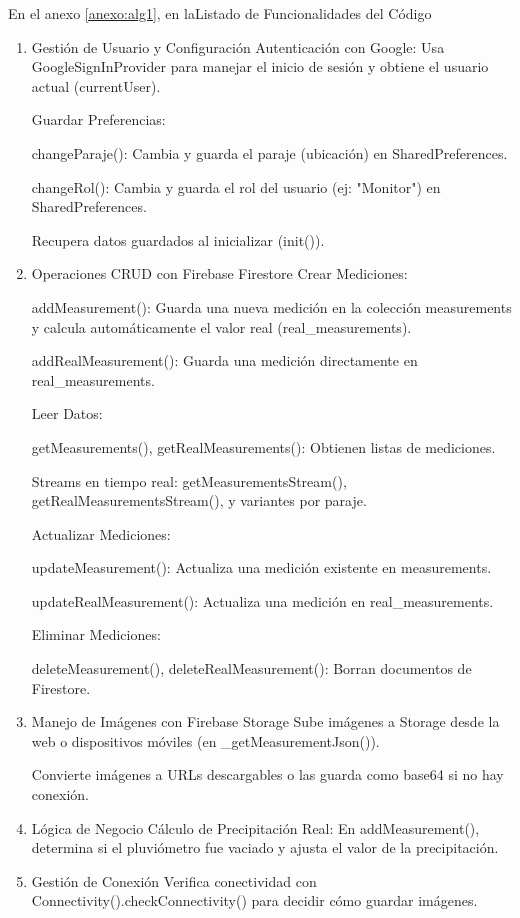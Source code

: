 En el anexo \ref{anexo:alg1}, en laListado de Funcionalidades del Código
\begin{enumerate}
    \item Gestión de Usuario y Configuración
    Autenticación con Google: Usa GoogleSignInProvider para manejar el inicio de sesión y obtiene el usuario actual (currentUser).
    
    Guardar Preferencias:
    
    changeParaje(): Cambia y guarda el paraje (ubicación) en SharedPreferences.
    
    changeRol(): Cambia y guarda el rol del usuario (ej: "Monitor") en SharedPreferences.
    
    Recupera datos guardados al inicializar (init()).
    
    \item Operaciones CRUD con Firebase Firestore
    Crear Mediciones:
    
    addMeasurement(): Guarda una nueva medición en la colección measurements y calcula automáticamente el valor real (real\_measurements).
    
    addRealMeasurement(): Guarda una medición directamente en real\_measurements.
    
    Leer Datos:
    
    getMeasurements(), getRealMeasurements(): Obtienen listas de mediciones.
    
    Streams en tiempo real: getMeasurementsStream(), getRealMeasurementsStream(), y variantes por paraje.
    
    Actualizar Mediciones:
    
    updateMeasurement(): Actualiza una medición existente en measurements.
    
    updateRealMeasurement(): Actualiza una medición en real\_measurements.
    
    Eliminar Mediciones:
    
    deleteMeasurement(), deleteRealMeasurement(): Borran documentos de Firestore.
    
    \item Manejo de Imágenes con Firebase Storage
    Sube imágenes a Storage desde la web o dispositivos móviles (en \_getMeasurementJson()).
    
    Convierte imágenes a URLs descargables o las guarda como base64 si no hay conexión.
    
    \item Lógica de Negocio
    Cálculo de Precipitación Real: En addMeasurement(), determina si el pluviómetro fue vaciado y ajusta el valor de la precipitación.
    
    \item Gestión de Conexión
    Verifica conectividad con Connectivity().checkConnectivity() para decidir cómo guardar imágenes.
    
\end{enumerate}

